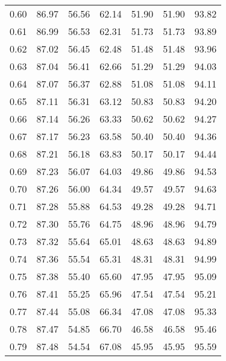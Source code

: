\begin{tabular}{|c|c|c|c|c|c|c|}
      0.60 &     86.97 &     56.56 &      62.14 &   51.90 &      51.90 &         93.82 \\
      0.61 &     86.99 &     56.53 &      62.31 &   51.73 &      51.73 &         93.89 \\
      0.62 &     87.02 &     56.45 &      62.48 &   51.48 &      51.48 &         93.96 \\
      0.63 &     87.04 &     56.41 &      62.66 &   51.29 &      51.29 &         94.03 \\
      0.64 &     87.07 &     56.37 &      62.88 &   51.08 &      51.08 &         94.11 \\
      0.65 &     87.11 &     56.31 &      63.12 &   50.83 &      50.83 &         94.20 \\
      0.66 &     87.14 &     56.26 &      63.33 &   50.62 &      50.62 &         94.27 \\
      0.67 &     87.17 &     56.23 &      63.58 &   50.40 &      50.40 &         94.36 \\
      0.68 &     87.21 &     56.18 &      63.83 &   50.17 &      50.17 &         94.44 \\
      0.69 &     87.23 &     56.07 &      64.03 &   49.86 &      49.86 &         94.53 \\
      0.70 &     87.26 &     56.00 &      64.34 &   49.57 &      49.57 &         94.63 \\
      0.71 &     87.28 &     55.88 &      64.53 &   49.28 &      49.28 &         94.71 \\
      0.72 &     87.30 &     55.76 &      64.75 &   48.96 &      48.96 &         94.79 \\
      0.73 &     87.32 &     55.64 &      65.01 &   48.63 &      48.63 &         94.89 \\
      0.74 &     87.36 &     55.54 &      65.31 &   48.31 &      48.31 &         94.99 \\
      0.75 &     87.38 &     55.40 &      65.60 &   47.95 &      47.95 &         95.09 \\
      0.76 &     87.41 &     55.25 &      65.96 &   47.54 &      47.54 &         95.21 \\
      0.77 &     87.44 &     55.08 &      66.34 &   47.08 &      47.08 &         95.33 \\
      0.78 &     87.47 &     54.85 &      66.70 &   46.58 &      46.58 &         95.46 \\
      0.79 &     87.48 &     54.54 &      67.08 &   45.95 &      45.95 &         95.59 \\

\end{tabular}
